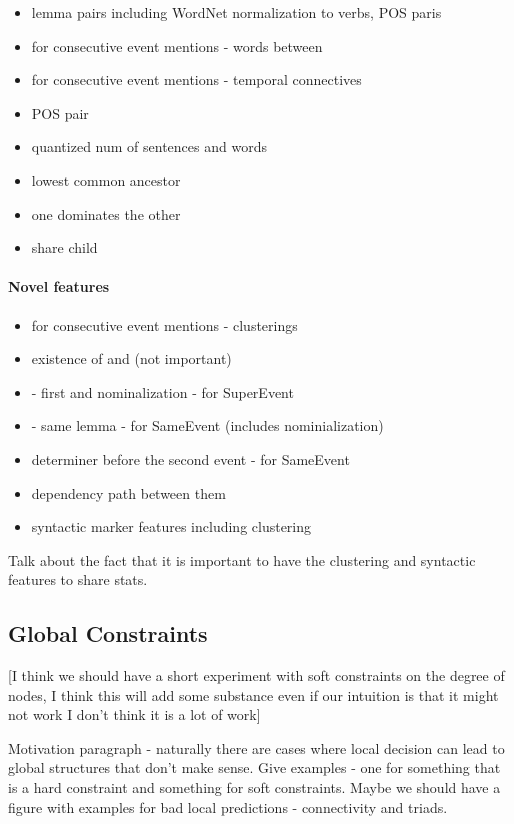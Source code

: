 \begin{itemize}
\item lemma pairs including WordNet normalization to verbs, POS paris
\item for consecutive event mentions - words between
\item for consecutive event mentions - temporal connectives
\item POS pair
\item quantized num of sentences and words
\item lowest common ancestor
\item one dominates the other
\item share child
\end{itemize}

\paragraph{Novel features}

\begin{itemize}
\item for consecutive event mentions - clusterings
\item existence of and (not important)
\item - first and nominalization - for SuperEvent
\item - same lemma - for SameEvent (includes nominialization)
\item determiner before the second event - for SameEvent
\item dependency path between them
\item syntactic marker features including clustering
\end{itemize}

Talk about the fact that it is important to have the clustering and syntactic features to share stats.


\subsection{Global Constraints} \label{subsec:global}

[I think we should have a short experiment with soft constraints on the degree of nodes, I think this will add some substance even if our intuition is that it might not work I don't think it is a lot of work]

Motivation paragraph - naturally there are cases where local decision can lead to global structures that don't make sense. Give examples - one for something that is a hard constraint and something for soft constraints. Maybe we should have a figure with examples for bad local predictions - connectivity and triads.

